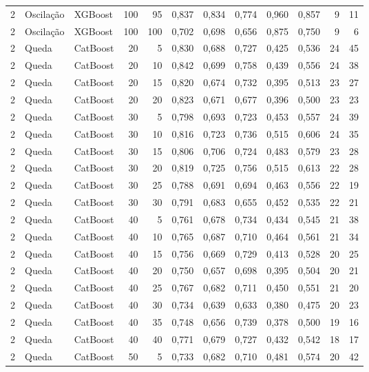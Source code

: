 \begin{longtable}{@{}rllrrrrrrrrr@{}}
2 & Oscilação & XGBoost & 100 & 95 & 0,837 & 0,834 & 0,774 & 0,960 & 0,857 & 9 & 11 \\
2 & Oscilação & XGBoost & 100 & 100 & 0,702 & 0,698 & 0,656 & 0,875 & 0,750 & 9 & 6 \\
2 & Queda & CatBoost & 20 & 5 & 0,830 & 0,688 & 0,727 & 0,425 & 0,536 & 24 & 45 \\
2 & Queda & CatBoost & 20 & 10 & 0,842 & 0,699 & 0,758 & 0,439 & 0,556 & 24 & 38 \\
2 & Queda & CatBoost & 20 & 15 & 0,820 & 0,674 & 0,732 & 0,395 & 0,513 & 23 & 27 \\
2 & Queda & CatBoost & 20 & 20 & 0,823 & 0,671 & 0,677 & 0,396 & 0,500 & 23 & 23 \\
2 & Queda & CatBoost & 30 & 5 & 0,798 & 0,693 & 0,723 & 0,453 & 0,557 & 24 & 39 \\
2 & Queda & CatBoost & 30 & 10 & 0,816 & 0,723 & 0,736 & 0,515 & 0,606 & 24 & 35 \\
2 & Queda & CatBoost & 30 & 15 & 0,806 & 0,706 & 0,724 & 0,483 & 0,579 & 23 & 28 \\
2 & Queda & CatBoost & 30 & 20 & 0,819 & 0,725 & 0,756 & 0,515 & 0,613 & 22 & 28 \\
2 & Queda & CatBoost & 30 & 25 & 0,788 & 0,691 & 0,694 & 0,463 & 0,556 & 22 & 19 \\
2 & Queda & CatBoost & 30 & 30 & 0,791 & 0,683 & 0,655 & 0,452 & 0,535 & 22 & 21 \\
2 & Queda & CatBoost & 40 & 5 & 0,761 & 0,678 & 0,734 & 0,434 & 0,545 & 21 & 38 \\
2 & Queda & CatBoost & 40 & 10 & 0,765 & 0,687 & 0,710 & 0,464 & 0,561 & 21 & 34 \\
2 & Queda & CatBoost & 40 & 15 & 0,756 & 0,669 & 0,729 & 0,413 & 0,528 & 20 & 25 \\
2 & Queda & CatBoost & 40 & 20 & 0,750 & 0,657 & 0,698 & 0,395 & 0,504 & 20 & 21 \\
2 & Queda & CatBoost & 40 & 25 & 0,767 & 0,682 & 0,711 & 0,450 & 0,551 & 21 & 20 \\
2 & Queda & CatBoost & 40 & 30 & 0,734 & 0,639 & 0,633 & 0,380 & 0,475 & 20 & 23 \\
2 & Queda & CatBoost & 40 & 35 & 0,748 & 0,656 & 0,739 & 0,378 & 0,500 & 19 & 16 \\
2 & Queda & CatBoost & 40 & 40 & 0,771 & 0,679 & 0,727 & 0,432 & 0,542 & 18 & 17 \\
2 & Queda & CatBoost & 50 & 5 & 0,733 & 0,682 & 0,710 & 0,481 & 0,574 & 20 & 42 \\

\end{longtable}
